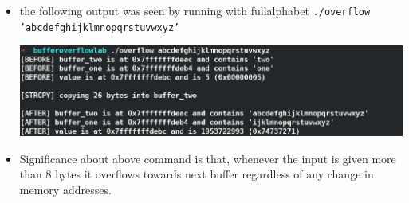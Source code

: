 \documentclass[11pt]{article}
\begin{document}
\begin{itemize}
\item the following output was seen by running with fullalphabet \texttt{./overflow 'abcdefghijklmnopqrstuvwxyz'}
\begin{center}
\includegraphics[width=.9\linewidth]{./bof_full_alpha.png}
\end{center}
\item Significance about above command is that, whenever the input is given more than 8 bytes it overflows towards next buffer regardless of any change in memory addresses.
\end{itemize}
\end{document}
